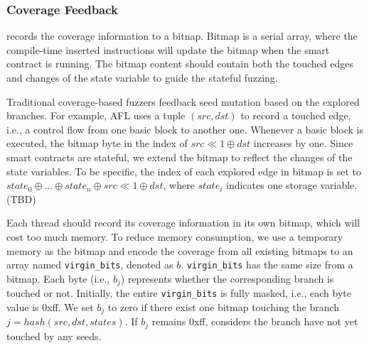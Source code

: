 \subsubsection{Coverage Feedback}
\label{sec:runner:coverage}
{\runner} records the coverage information to a bitnap.
Bitmap is a serial array, where the compile-time inserted instructions will update the bitmap when the smart contract is running. 
%
The bitmap content should contain both the touched edges and changes of the state variable to guide the stateful fuzzing.


Traditional coverage-based fuzzers feedback seed mutation based on the explored branches.
For example, AFL uses a tuple $(src, dst)$ to record a touched edge, i.e., a control flow from one basic block to another one. Whenever a basic block is executed, the bitmap byte in the index of $src \ll 1 \oplus dst$ increases by one. 
Since smart contracts are stateful, we extend the bitmap to reflect the changes of the state variables. 
To be specific, the index of each explored edge in bitmap is set to $state_0 \oplus ... \oplus state_n \oplus src \ll 1 \oplus dst$, where $state_i$ indicates one storage variable. (TBD)


Each thread should record its coverage information in its own bitmap, which will cost too much memory. 
To reduce memory consumption, we use a temporary memory as the bitmap and encode the coverage from all existing bitmaps to an array named \texttt{virgin\_bits}\cite{afl}, denoted as $b$. 
\texttt{virgin\_bits} has the same size from a bitmap.
Each byte (i.e., $b_j$) represents whether the corresponding branch is touched or not.
Initially, the entire \texttt{virgin\_bits} is fully masked, i.e., each byte value is 0xff.
We set $b_j$ to zero if there exist one bitmap touching the branch $j = hash(src,dst,states)$. 
If $b_j$ remains 0xff, {\runner} considers the branch have not yet touched by any seeds. 

